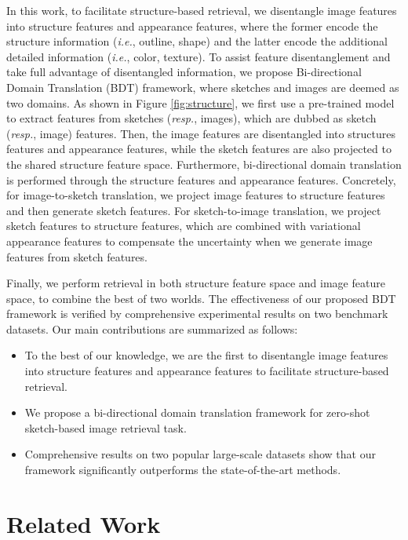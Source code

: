 \documentclass[10pt,twocolumn,letterpaper]{article}
\begin{document}
In this work, to facilitate structure-based retrieval, we disentangle image features into structure features and appearance features, where the former encode the structure information (\emph{i.e.}, outline, shape) and the latter encode the additional detailed information (\emph{i.e.}, color, texture).
To assist feature disentanglement and take full advantage of disentangled information, we propose Bi-directional Domain Translation (BDT) framework, where sketches and images are deemed as two domains. 
As shown in Figure \ref{fig:structure}, we first use a pre-trained model to extract features from sketches (\emph{resp.}, images), which are dubbed as sketch (\emph{resp.}, image) features. 
Then, the image features are disentangled into structures features and appearance features, while the sketch features are also projected to the shared structure feature space. 
Furthermore, bi-directional domain translation is performed through the structure features and appearance features.
Concretely, for image-to-sketch translation, we project image features to structure features and then generate sketch features. For sketch-to-image translation, we project sketch features to structure features, which are combined with variational appearance features to compensate the uncertainty when we generate image features from sketch features.
 
Finally, we perform retrieval in both structure feature space and image feature space, to combine the best of two worlds. 
The effectiveness of our proposed BDT framework is verified by comprehensive experimental results on two benchmark datasets. Our main contributions are summarized as follows:
\begin{itemize}
    \item To the best of our knowledge, we are the first to disentangle image features into structure features and appearance features to facilitate structure-based retrieval.
    \item We propose a bi-directional domain translation framework for zero-shot sketch-based image retrieval task.
    \item Comprehensive results on two popular large-scale datasets show that our framework significantly outperforms the state-of-the-art methods.
\end{itemize}

\section{Related Work}
\end{document}
